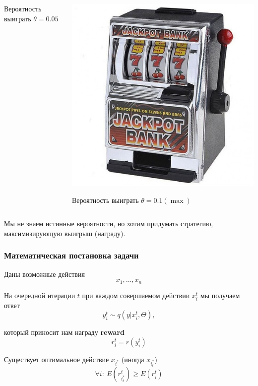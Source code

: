 \documentclass[fullscreen=true, bookmarks=true, hyperref={pdfencoding=unicode}]{beamer}
\begin{document}
\begin{frame}
\begin{columns}
\begin{column}{.25\paperwidth}
\begin{center}
        Вероятность выиграть $\theta = 0.05$
        \end{center}
      \end{column}
      \begin{column}{.25\paperwidth}
        \begin{center}
          \includegraphics[keepaspectratio,
                           width=.2\paperwidth]{data-kopilkabandit.jpg}

           Вероятность выиграть $\theta = 0.1 (\max)$
        \end{center}
      \end{column}
  \end{columns}

  \vspace{1cm}
  Мы не знаем истинные вероятности, но хотим придумать стратегию, максимизирующую выигрыш (награду).
\end{frame}


\begin{frame}
  \frametitle{Математическая постановка задачи}

  Даны возможные действия $$x_1, \dots, x_n$$

  На очередной итерации $t$ при каждом совершаемом действии $x^t_i$ мы получаем ответ $$ y^t_i \sim q(y|x^t_i, \Theta),$$

  который приносит нам награду {\bf reward} $$r_i^t = r(y^t_i)$$

  Существует оптимальное действие $x_{i^*}$ (иногда $x_{i^*_t}$) $$\forall i:\ E(r_{i^*_t}^t) \geq E(r^t_i)$$
\end{frame}
\end{document}
